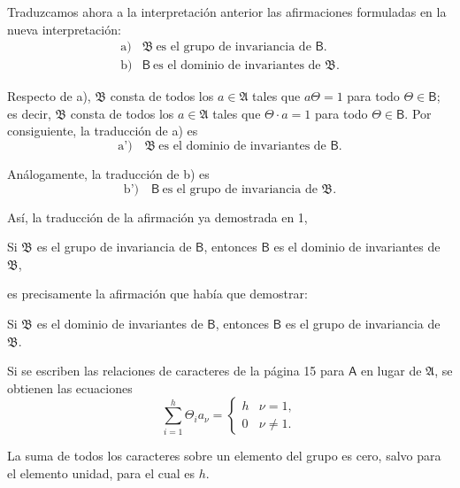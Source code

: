 Traduzcamos ahora a la interpretación anterior las afirmaciones formuladas en la nueva interpretación:
\[
\begin{array}{ll}
\text{a)}& \mathfrak B\ \text{es el grupo de invariancia de }\mathsf B.\\
\text{b)}& \mathsf B\ \text{es el dominio de invariantes de }\mathfrak B.
\end{array}
\]

Respecto de a), \(\mathfrak B\) consta de todos los \(a\in\mathfrak A\) tales que \(a\Theta=1\) para todo \(\Theta\in\mathsf B\); es decir, \(\mathfrak B\) consta de todos los \(a\in\mathfrak A\) tales que \(\Theta\cdot a=1\) para todo \(\Theta\in\mathsf B\). Por consiguiente, la traducción de a) es
\[
\text{a')} \quad \mathfrak B\ \text{es el dominio de invariantes de }\mathsf B.
\]

Análogamente, la traducción de b) es
\[
\text{b')} \quad \mathsf B\ \text{es el grupo de invariancia de }\mathfrak B.
\]

Así, la traducción de la afirmación ya demostrada en 1,

Si \(\mathfrak B\) es el grupo de invariancia de \(\mathsf B\), entonces \(\mathsf B\) es el dominio de invariantes de \(\mathfrak B\),

es precisamente la afirmación que había que demostrar:

Si \(\mathfrak B\) es el dominio de invariantes de \(\mathsf B\), entonces \(\mathsf B\) es el grupo de invariancia de \(\mathfrak B\).

Si se escriben las relaciones de caracteres de la página 15 para \(\mathsf A\) en lugar de \(\mathfrak A\), se obtienen las ecuaciones
\[
\sum_{i=1}^{h} \Theta_i a_\nu =
\begin{cases}
h & \nu=1,\\
0 & \nu\ne 1.
\end{cases}
\]

La suma de todos los caracteres sobre un elemento del grupo es cero, salvo para el elemento unidad, para el cual es \(h\).
